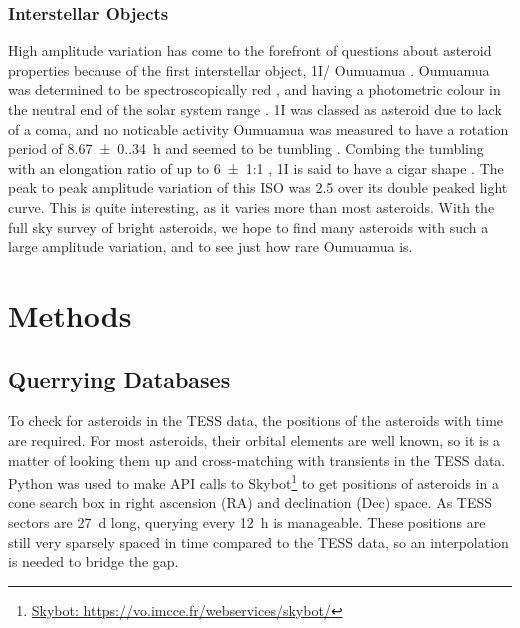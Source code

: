 \documentclass[12pt]{article}
\DeclareRobustCommand{\okina}{%
  \raisebox{\dimexpr\fontcharht\font`A-\height}{%
    \scalebox{0.8}{`}%
  }%
}
\newcommand{\omuamua}{\okina Oumuamua }
\begin{document}
\subsubsection*{Interstellar Objects}
High amplitude variation has come to the forefront of questions about asteroid properties because of the first interstellar object, 1I/\omuamua \citep[see][for a review]{Bannister2019}.
\omuamua was determined to be spectroscopically red \citep{Fitzsimmons2017, Meech2017}, and having a photometric colour in the neutral end of the solar system range \citep{Bannister2017}.
1I was classed as asteroid due to lack of a coma, and no noticable activity %
\omuamua was measured to have a rotation period of \qty{8.67(0.34)}{\hour} \citep{Belton2018} and seemed to be tumbling \citep[e.g.][]{Drahus2018,Fraser2018}.
Combing the tumbling with an elongation ratio of up to \qty{6(1)}{}:1 \citep{McNeill2018}, 1I is said to have a cigar shape \citep{Belton2018}.
The peak to peak amplitude variation of this ISO was \qty{2.5}{\mag} \citep{Meech2017} over its double peaked light curve.
This is quite interesting, as it varies more than most asteroids.
With the full sky survey of bright asteroids, we hope to find many asteroids with such a large amplitude variation, and to see just how rare \omuamua is.


\section{Methods}\label{Sec:Meth}

\subsection{Querrying Databases}\label{SubSec:Querry}

To check for asteroids in the TESS data, the positions of the asteroids with time are required.
For most asteroids, their orbital elements are well known, so it is a matter of looking them up and cross-matching with transients in the TESS data.
Python was used to make API calls to {Skybot}\footnote{\href{https://vo.imcce.fr/webservices/skybot/}{Skybot: https://vo.imcce.fr/webservices/skybot/}} to get positions of asteroids in a cone search box in right ascension (RA) and  declination (Dec) space.
As TESS sectors are \qty{27}{\day} long, querying every \qty{12}{\hour} is manageable.
These positions are still very sparsely spaced in time compared to the TESS data, so an interpolation is needed to bridge the gap.
\end{document}
